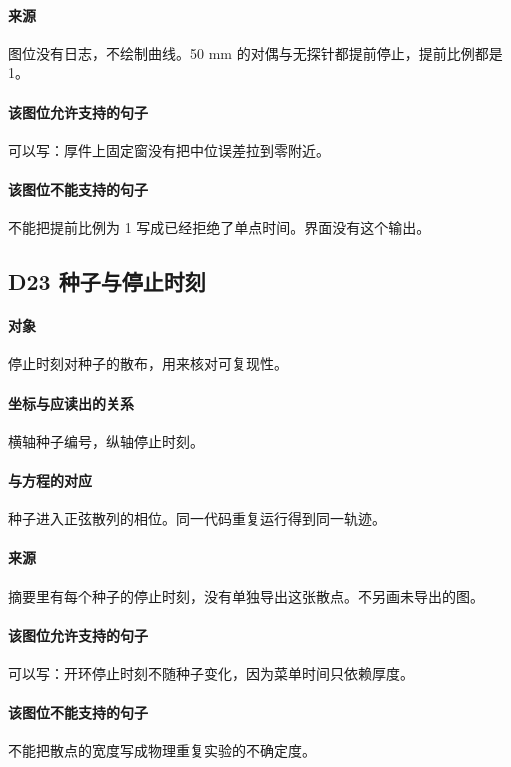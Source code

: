 \paragraph{来源}
图位没有日志，不绘制曲线。50 mm 的对偶与无探针都提前停止，提前比例都是 1。

\paragraph{该图位允许支持的句子}
可以写：厚件上固定窗没有把中位误差拉到零附近。

\paragraph{该图位不能支持的句子}
不能把提前比例为 1 写成已经拒绝了单点时间。界面没有这个输出。

\subsection{D23 种子与停止时刻}
\paragraph{对象}
停止时刻对种子的散布，用来核对可复现性。

\paragraph{坐标与应读出的关系}
横轴种子编号，纵轴停止时刻。

\paragraph{与方程的对应}
种子进入正弦散列的相位。同一代码重复运行得到同一轨迹。

\paragraph{来源}
摘要里有每个种子的停止时刻，没有单独导出这张散点。不另画未导出的图。

\paragraph{该图位允许支持的句子}
可以写：开环停止时刻不随种子变化，因为菜单时间只依赖厚度。

\paragraph{该图位不能支持的句子}
不能把散点的宽度写成物理重复实验的不确定度。

